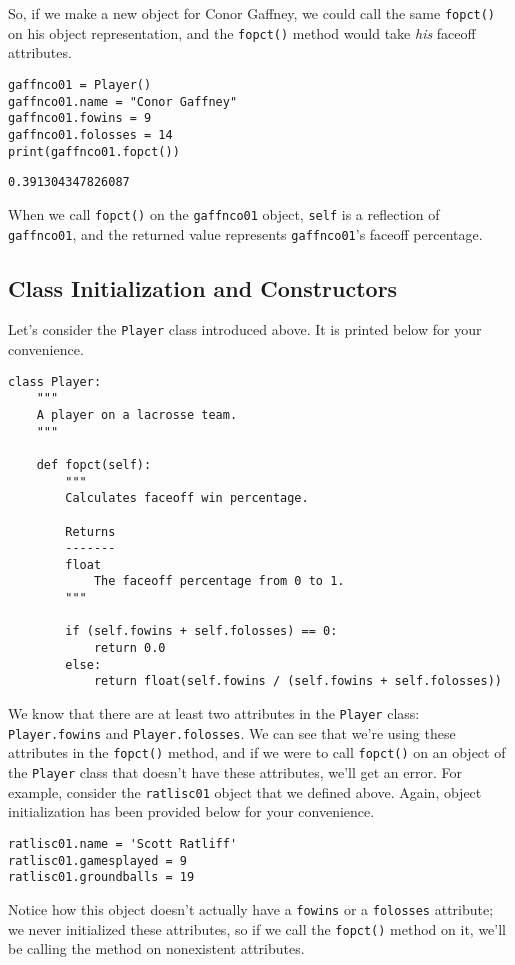 So, if we make a new object for Conor Gaffney, we could call the same \verb|fopct()| on his object representation, and the \verb|fopct()| method would take \textit{his} faceoff attributes.
\begin{lstlisting}[style=pippython]
gaffnco01 = Player()
gaffnco01.name = "Conor Gaffney"
gaffnco01.fowins = 9
gaffnco01.folosses = 14
print(gaffnco01.fopct())
\end{lstlisting}
\begin{lstlisting}[style=none]
0.391304347826087
\end{lstlisting}
When we call \verb|fopct()| on the \verb|gaffnco01| object, \verb|self| is a reflection of \verb|gaffnco01|, and the returned value represents \verb|gaffnco01|'s faceoff percentage.
\subsection{Class Initialization and Constructors}
Let's consider the \verb|Player| class introduced above. It is printed below for your convenience.
\begin{lstlisting}[style=pippython]
class Player:
	"""
	A player on a lacrosse team.
	"""

	def fopct(self):
		"""
		Calculates faceoff win percentage.
		
		Returns
		-------
		float
			The faceoff percentage from 0 to 1.
		"""
		
		if (self.fowins + self.folosses) == 0:
			return 0.0
		else:
			return float(self.fowins / (self.fowins + self.folosses))
\end{lstlisting}
We know that there are at least two attributes in the \verb|Player| class: \verb|Player.fowins| and \verb|Player.folosses|. We can see that we're using these attributes in the \verb|fopct()| method, and if we were to call \verb|fopct()| on an object of the \verb|Player| class that doesn't have these attributes, we'll get an error. For example, consider the \verb|ratlisc01| object that we defined above. Again, object initialization has been provided below for your convenience.\par
\begin{lstlisting}[style=pippython]
ratlisc01.name = 'Scott Ratliff'
ratlisc01.gamesplayed = 9
ratlisc01.groundballs = 19
\end{lstlisting}
Notice how this object doesn't actually have a \verb|fowins| or a \verb|folosses| attribute; we never initialized these attributes, so if we call the \verb|fopct()| method on it, we'll be calling the method on nonexistent attributes.

